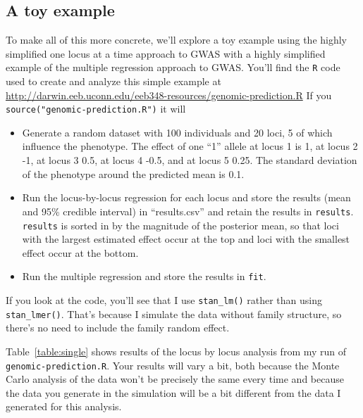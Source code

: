 \documentclass[12pt]{article}
\begin{document}
\subsection*{A toy example}

To make all of this more concrete, we'll explore a toy example using
the highly simplified one locus at a time approach to GWAS with a
highly simplified example of the multiple regression approach to
GWAS. You'll find the {\tt R} code used to create and analyze this
simple example at
\url{http://darwin.eeb.uconn.edu/eeb348-resources/genomic-prediction.R}
If you {\tt source("genomic-prediction.R")} it will

\begin{itemize}

\item Generate a random dataset with 100 individuals and 20 loci, 5 of
  which influence the phenotype. The effect of one ``1'' allele at
  locus 1 is 1, at locus 2 -1, at locus 3 0.5, at locus 4 -0.5, and at
  locus 5 0.25. The standard deviation of the phenotype around the
  predicted mean is 0.1.

\item Run the locus-by-locus regression for each locus and store the
  results (mean and 95\% credible interval) in ``results.csv'' and
  retain the results in {\tt results}. {\tt results} is sorted in by
  the magnitude of the posterior mean, so that loci with the largest
  estimated effect occur at the top and loci with the smallest effect
  occur at the bottom.

\item Run the multiple regression and store the results in {\tt fit}. 
    
\end{itemize}

If you look at the code, you'll see that I use {\tt stan\_lm()} rather
than using {\tt stan\_lmer()}. That's because I simulate the data without
family structure, so there's no need to include the family random
effect.

Table~\ref{table:single} shows results of the locus by locus analysis
from my run of {\tt genomic-prediction.R}. Your results will vary a
bit, both because the Monte Carlo analysis of the data won't be
precisely the same every time and because the data you generate in the
simulation will be a bit different from the data I generated for this
analysis.
\end{document}

